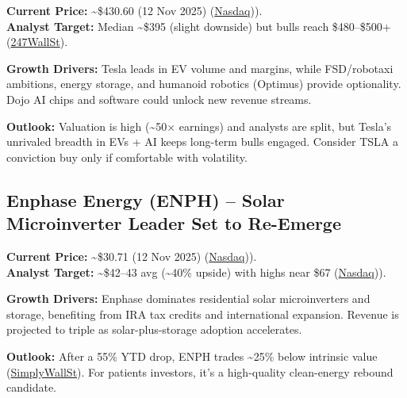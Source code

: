 \documentclass[
]{article}
\begin{document}
\textbf{Current Price:} \textasciitilde\$430.60 (12 Nov 2025)
(\href{https://www.nasdaq.com/market-activity/stocks/tsla/historical\#:~:text=Tesla\%2C\%20Inc,103\%2C471\%2C500}{Nasdaq})).\\
\textbf{Analyst Target:} Median \textasciitilde\$395 (slight downside)
but bulls reach \$480--\$500+
(\href{https://247wallst.com/investing/2025/11/11/wall-street-price-prediction-teslas-share-price-forecast-for-2025/\#:~:text=In\%20October\%2C\%20Stifel\%20raised\%20its,showing\%20Tesla’s\%20deliveries\%20are\%20rising}{247WallSt}).

\textbf{Growth Drivers:} Tesla leads in EV volume and margins, while
FSD/robotaxi ambitions, energy storage, and humanoid robotics (Optimus)
provide optionality. Dojo AI chips and software could unlock new revenue
streams.

\textbf{Outlook:} Valuation is high (\textasciitilde50× earnings) and
analysts are split, but Tesla's unrivaled breadth in EVs + AI keeps
long-term bulls engaged. Consider TSLA a conviction buy only if
comfortable with volatility.

\hypertarget{enphase-energy-enph-solar-microinverter-leader-set-to-re-emerge}{%
\subsection{Enphase Energy (ENPH) -- Solar Microinverter Leader Set to
Re-Emerge}\label{enphase-energy-enph-solar-microinverter-leader-set-to-re-emerge}}

\textbf{Current Price:} \textasciitilde\$30.71 (12 Nov 2025)
(\href{https://www.nasdaq.com/market-activity/stocks/enph/historical\#:~:text=Enphase\%20Energy\%2C\%20Inc,7\%2C590\%2C300}{Nasdaq})).\\
\textbf{Analyst Target:} \textasciitilde\$42--43 avg
(\textasciitilde40\% upside) with highs near \$67
(\href{https://www.nasdaq.com/articles/barclays-maintains-enphase-energy-enph-underweight-recommendation\#:~:text=Analyst\%20Price\%20Forecast\%20Suggests\%2019.19,Upside}{Nasdaq})).

\textbf{Growth Drivers:} Enphase dominates residential solar
microinverters and storage, benefiting from IRA tax credits and
international expansion. Revenue is projected to triple as
solar-plus-storage adoption accelerates.

\textbf{Outlook:} After a 55\% YTD drop, ENPH trades \textasciitilde25\%
below intrinsic value
(\href{https://simplywall.st/stocks/us/semiconductors/nasdaq-enph/enphase-energy/news/enphase-energy-enph-assessing-valuation-after-san-diego-comm\#:~:text=Most\%20Popular\%20Narrative\%3A\%2025.2}{SimplyWallSt}).
For patients investors, it's a high-quality clean-energy rebound
candidate.
\end{document}
